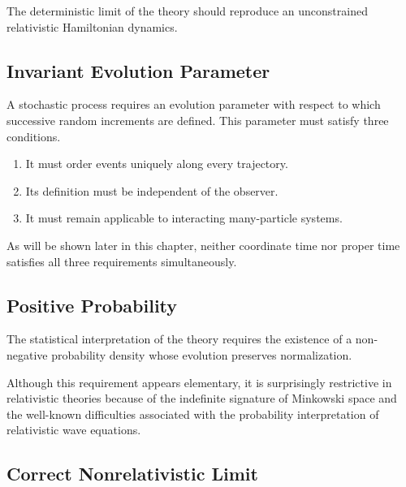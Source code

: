 The deterministic limit of the theory should reproduce an unconstrained
relativistic Hamiltonian dynamics.

\subsection{Invariant Evolution Parameter}

A stochastic process requires an evolution parameter with respect to
which successive random increments are defined.
This parameter must satisfy three conditions.
\begin{enumerate}
\item
    It must order events uniquely along every trajectory.
\item
    Its definition must be independent of the observer.
\item
    It must remain applicable to interacting many-particle systems.
\end{enumerate}
As will be shown later in this chapter, neither coordinate time nor
proper time satisfies all three requirements simultaneously.

\subsection{Positive Probability}

The statistical interpretation of the theory requires the existence of a
non-negative probability density whose evolution preserves
normalization.

Although this requirement appears elementary, it is surprisingly
restrictive in relativistic theories because of the indefinite signature
of Minkowski space and the well-known difficulties associated with the
probability interpretation of relativistic wave equations.

\subsection{Correct Nonrelativistic Limit}

